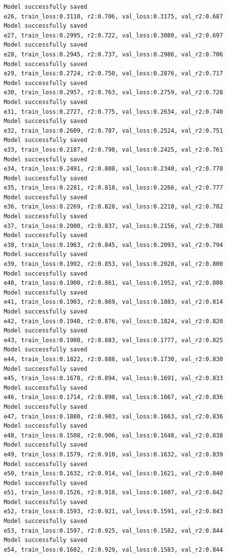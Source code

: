 \documentclass[a4paper, 12pt]{article}
\begin{document}
\begin{lstlisting}
	Model successfully saved
	e26, train_loss:0.3110, r2:0.706, val_loss:0.3175, val_r2:0.687
	Model successfully saved
	e27, train_loss:0.2995, r2:0.722, val_loss:0.3080, val_r2:0.697
	Model successfully saved
	e28, train_loss:0.2945, r2:0.737, val_loss:0.2986, val_r2:0.706
	Model successfully saved
	e29, train_loss:0.2724, r2:0.750, val_loss:0.2876, val_r2:0.717
	Model successfully saved
	e30, train_loss:0.2957, r2:0.763, val_loss:0.2759, val_r2:0.728
	Model successfully saved
	e31, train_loss:0.2727, r2:0.775, val_loss:0.2634, val_r2:0.740
	Model successfully saved
	e32, train_loss:0.2609, r2:0.787, val_loss:0.2524, val_r2:0.751
	Model successfully saved
	e33, train_loss:0.2187, r2:0.798, val_loss:0.2425, val_r2:0.761
	Model successfully saved
	e34, train_loss:0.2491, r2:0.808, val_loss:0.2340, val_r2:0.770
	Model successfully saved
	e35, train_loss:0.2281, r2:0.818, val_loss:0.2266, val_r2:0.777
	Model successfully saved
	e36, train_loss:0.2269, r2:0.828, val_loss:0.2210, val_r2:0.782
	Model successfully saved
	e37, train_loss:0.2000, r2:0.837, val_loss:0.2156, val_r2:0.788
	Model successfully saved
	e38, train_loss:0.1963, r2:0.845, val_loss:0.2093, val_r2:0.794
	Model successfully saved
	e39, train_loss:0.1992, r2:0.853, val_loss:0.2028, val_r2:0.800
	Model successfully saved
	e40, train_loss:0.1900, r2:0.861, val_loss:0.1952, val_r2:0.808
	Model successfully saved
	e41, train_loss:0.1903, r2:0.869, val_loss:0.1883, val_r2:0.814
	Model successfully saved
	e42, train_loss:0.1940, r2:0.876, val_loss:0.1824, val_r2:0.820
	Model successfully saved
	e43, train_loss:0.1980, r2:0.883, val_loss:0.1777, val_r2:0.825
	Model successfully saved
	e44, train_loss:0.1822, r2:0.888, val_loss:0.1730, val_r2:0.830
	Model successfully saved
	e45, train_loss:0.1678, r2:0.894, val_loss:0.1691, val_r2:0.833
	Model successfully saved
	e46, train_loss:0.1714, r2:0.898, val_loss:0.1667, val_r2:0.836
	Model successfully saved
	e47, train_loss:0.1880, r2:0.903, val_loss:0.1663, val_r2:0.836
	Model successfully saved
	e48, train_loss:0.1508, r2:0.906, val_loss:0.1648, val_r2:0.838
	Model successfully saved
	e49, train_loss:0.1579, r2:0.910, val_loss:0.1632, val_r2:0.839
	Model successfully saved
	e50, train_loss:0.1632, r2:0.914, val_loss:0.1621, val_r2:0.840
	Model successfully saved
	e51, train_loss:0.1526, r2:0.918, val_loss:0.1607, val_r2:0.842
	Model successfully saved
	e52, train_loss:0.1593, r2:0.921, val_loss:0.1591, val_r2:0.843
	Model successfully saved
	e53, train_loss:0.1597, r2:0.925, val_loss:0.1582, val_r2:0.844
	Model successfully saved
	e54, train_loss:0.1602, r2:0.929, val_loss:0.1583, val_r2:0.844

\end{lstlisting}
\end{document}

